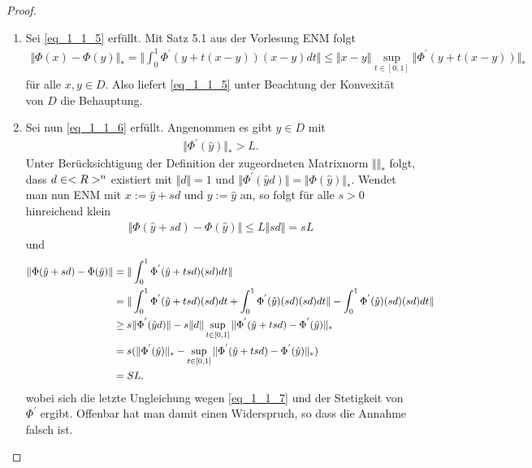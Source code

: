 \begin{proof}
	\begin{enumerate}
		\item Sei \ref{eq_1_1_5} erfüllt. Mit Satz 5.1 aus der Vorlesung ENM folgt %
		\begin{align}
		\Vert \Phi(x) - \Phi(y) \Vert_{\ast} = \Vert \int_{0}^{1} \Phi^{'}(y + t(x-y))(x-y) dt \Vert \le \Vert x-y \Vert \sup_{t \in [0,1]} \Vert \Phi^{'}(y+t(x-y))\Vert_{\ast}
		\end{align}
		für alle $x,y \in D$. Also liefert \ref{eq_1_1_5} unter Beachtung der Konvexität von $D$ die Behauptung.
		\item Sei nun \ref{eq_1_1_6} erfüllt. Angenommen es gibt $\hat{y} \in D$ mit
		\begin{align}
		\Vert \Phi^{'}(\hat{y})\Vert_{\ast} > L. \label{eq_1_1_7}
		\end{align}
		Unter Berücksichtigung der Definition der zugeordneten Matrixnorm $\Vert \Vert_{\ast}$ folgt, dass $d \in <R>^n$ existiert mit $\Vert d \Vert = 1$ und $\Vert \Phi^{'}(\hat{y}d)\Vert = \Vert \Phi(\hat{y}) \Vert_{\ast}$. Wendet man nun ENM mit $x := \hat{y} + sd$ und $y := \hat{y}$ an, so folgt für alle $s > 0$ hinreichend klein
		\begin{align}
		\Vert \Phi(\hat{y} + sd) - \Phi(\hat{y})\Vert \le L \Vert sd \Vert = sL
		\end{align}
		und 
		\begin{align}
		\Vert \Phi(\hat{y} + sd) - \Phi(\hat{y})\Vert &= \Vert \int_{0}^{1} \Phi^{'}(\hat{y} + tsd)(sd)dt\Vert\notag \\
		&= \Vert \int_{0}^{1} \Phi^{'}(\hat{y} + tsd)(sd)dt + \int_{0}^{1} \Phi^{'}(\hat{y})(sd)(sd)dt\Vert - \int_{0}^{1} \Phi^{'}(\hat{y})(sd)(sd)dt\Vert\notag \\
		&\ge s\Vert \Phi^{'}(\hat{y}d)\Vert - s\Vert d\Vert \sup_{t \in [0,1]}\Vert\Phi^{'}(\hat{y} + tsd) - \Phi^{'}(\hat{y})\Vert_{\ast} \notag \\
		&= s (\Vert \Phi^{'}(\hat{y}) \Vert_{\ast} - \sup_{t \in [0,1]}\Vert\Phi^{'}(\hat{y} + tsd) - \Phi^{'}(\hat{y})\Vert_{\ast}) \notag\\
		&= SL, \notag
		\end{align}
		wobei sich die letzte Ungleichung wegen \ref{eq_1_1_7} und der Stetigkeit von $\Phi^{'}$ ergibt. Offenbar hat man damit einen Widerspruch, so dass die Annahme falsch ist.
	\end{enumerate}
\end{proof}

